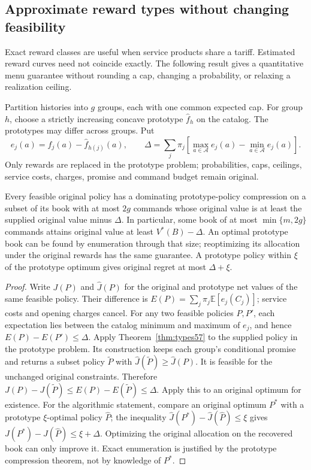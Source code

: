 \subsection{Approximate reward types without changing feasibility}\label{sec:robusttypes58}
Exact reward classes are useful when service products share a tariff. Estimated reward curves need not coincide exactly. The following result gives a quantitative menu guarantee without rounding a cap, changing a probability, or relaxing a realization ceiling.

Partition histories into $g$ groups, each with one common expected cap. For group $h$, choose a strictly increasing concave prototype $\widehat f_h$ on the catalog. The prototypes may differ across groups. Put
\begin{equation}\label{eq:oscillation58}
 e_j(a)=f_j(a)-\widehat f_{h(j)}(a),\qquad
 \Delta=\sum_j\pi_j\left[\max_{a\in\mathcal A}e_j(a)-\min_{a\in\mathcal A}e_j(a)\right].
\end{equation}
Only rewards are replaced in the prototype problem; probabilities, caps, ceilings, service costs, charges, promise and command budget remain original.
\begin{theorem}\label{thm:robusttypes58}
Every feasible original policy has a dominating prototype-policy compression on a subset of its book with at most $2g$ commands whose original value is at least the supplied original value minus $\Delta$. In particular, some book of at most $\min\{m,2g\}$ commands attains original value at least $V^*(B)-\Delta$. An optimal prototype book can be found by enumeration through that size; reoptimizing its allocation under the original rewards has the same guarantee. A prototype policy within $\xi$ of the prototype optimum gives original regret at most $\Delta+\xi$.
\end{theorem}
\begin{proof}
Write $J(P)$ and $\widehat J(P)$ for the original and prototype net values of the same feasible policy. Their difference is
$E(P)=\sum_j\pi_j\mathbb E[e_j(C_j)]$; service costs and opening charges cancel. For any two feasible policies $P,P'$, each expectation lies between the catalog minimum and maximum of $e_j$, and hence
$E(P)-E(P')\leq\Delta$.
Apply Theorem~\ref{thm:types57} to the supplied policy in the prototype problem. Its construction keeps each group's conditional promise and returns a subset policy $\widetilde P$ with $\widehat J(\widetilde P)\geq\widehat J(P)$. It is feasible for the unchanged original constraints. Therefore
$J(P)-J(\widetilde P)\leq E(P)-E(\widetilde P)\leq\Delta$.
Apply this to an original optimum for existence. For the algorithmic statement, compare an original optimum $P^*$ with a prototype $\xi$-optimal policy $\widehat P$; the inequality $\widehat J(P^*)-\widehat J(\widehat P)\leq\xi$ gives $J(P^*)-J(\widehat P)\leq\xi+\Delta$. Optimizing the original allocation on the recovered book can only improve it. Exact enumeration is justified by the prototype compression theorem, not by knowledge of $P^*$.
\end{proof}

